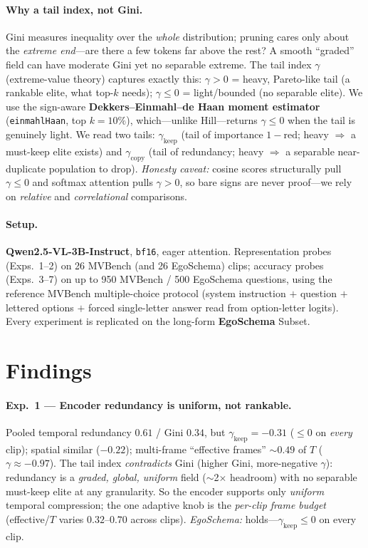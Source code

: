 \documentclass[11pt]{article}
\newcommand{\gm}{\gamma}
\newcommand{\gkeep}{\gamma_{\mathrm{keep}}}
\newcommand{\gcopy}{\gamma_{\mathrm{copy}}}
\begin{document}
\paragraph{Why a tail index, not Gini.} Gini measures inequality over the \emph{whole}
distribution; pruning cares only about the \emph{extreme end}---are there a few tokens far above
the rest? A smooth ``graded'' field can have moderate Gini yet no separable extreme. The tail
index $\gm$ (extreme-value theory) captures exactly this: $\gm{>}0$ = heavy, Pareto-like tail (a
rankable elite, what top-$k$ needs); $\gm{\le}0$ = light/bounded (no separable elite). We use the
sign-aware \textbf{Dekkers--Einmahl--de Haan moment estimator} (\texttt{einmahlHaan}, top $k{=}10\%$),
which---unlike Hill---returns $\gm{\le}0$ when the tail is genuinely light. We read two tails:
$\gkeep$ (tail of importance $1{-}\mathrm{red}$; heavy $\Rightarrow$ a must-keep elite exists) and
$\gcopy$ (tail of redundancy; heavy $\Rightarrow$ a separable near-duplicate population to drop).
\emph{Honesty caveat:} cosine scores structurally pull $\gm{\le}0$ and softmax attention pulls
$\gm{>}0$, so bare signs are never proof---we rely on \emph{relative} and \emph{correlational}
comparisons.

\paragraph{Setup.} \textbf{Qwen2.5-VL-3B-Instruct}, \texttt{bf16}, eager attention. Representation
probes (Exps.~1--2) on 26 MVBench (and 26 EgoSchema) clips; accuracy probes (Exps.~3--7) on up to
950 MVBench / 500 EgoSchema questions, using the reference MVBench multiple-choice protocol (system
instruction $+$ question $+$ lettered options $+$ forced single-letter answer read from option-letter
logits). Every experiment is replicated on the long-form \textbf{EgoSchema} Subset.

\section{Findings}

\paragraph{Exp.~1 --- Encoder redundancy is uniform, not rankable.} Pooled temporal redundancy
$0.61$ / Gini $0.34$, but $\gkeep=-0.31$ ($\le0$ on \emph{every} clip); spatial similar
($-0.22$); multi-frame ``effective frames'' $\sim$$0.49$ of $T$ ($\gm{\approx}{-}0.97$). The tail index
\emph{contradicts} Gini (higher Gini, more-negative $\gm$): redundancy is a \emph{graded, global,
uniform} field ($\sim$2$\times$ headroom) with no separable must-keep elite at any granularity. So
the encoder supports only \emph{uniform} temporal compression; the one adaptive knob is the
\emph{per-clip frame budget} (effective/$T$ varies $0.32$--$0.70$ across clips).
\emph{EgoSchema:} holds---$\gkeep\le0$ on every clip.
\end{document}
